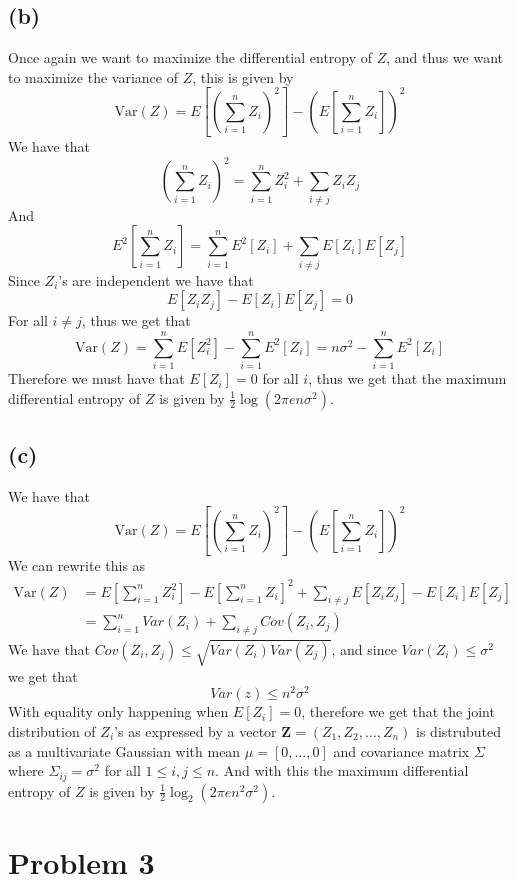 \subsection*{(b)}
Once again we want to maximize the differential entropy of $Z$,
and thus we want to maximize the variance of $Z$, this is given by
$$\text{Var}(Z)=E[(\sum_{i=1}^{n}Z_i)^2]-(E[\sum_{i=1}^{n}Z_i])^2$$
We have that 
$$\left(\sum_{i=1}^{n}Z_i\right)^2=\sum_{i=1}^{n}Z_i^2+\sum_{i\neq j}Z_iZ_j$$
And
$$E^2[\sum_{i=1}^{n}Z_i]=\sum_{i=1}^{n}E^2[Z_i]+\sum_{i\neq j}E[Z_i]E[Z_j]$$
Since $Z_i$'s are independent we have that
$$E[Z_iZ_j]-E[Z_i]E[Z_j]=0$$
For all $i\neq j$, thus we get that
$$\text{Var}(Z)=\sum_{i=1}^{n}E[Z_i^2]-\sum_{i=1}^{n}E^2[Z_i]=n\sigma^2-\sum_{i=1}^{n}E^2[Z_i]$$
Therefore we must have that $E[Z_i]=0$ for all $i$, thus we get that
the maximum differential entropy of $Z$ is given by $\boxed{\frac{1}{2}\log(2\pi e n\sigma^2)}$.
\subsection*{(c)}
We have that 
$$\text{Var}(Z)=E[(\sum_{i=1}^{n}Z_i)^2]-(E[\sum_{i=1}^{n}Z_i])^2$$
We can rewrite this as 
\begin{align*}
    \text{Var}(Z)&=E[\sum_{i=1}^{n}Z_i^2]-E[\sum_{i=1}^{n}Z_i]^2+\sum_{i\neq j}E[Z_iZ_j]-E[Z_i]E[Z_j]\\
    &=\sum_{i=1}^{n}Var(Z_i)+\sum_{i\neq j}Cov(Z_i,Z_j)
\end{align*}
We have that $Cov(Z_i,Z_j)\leq \sqrt{Var(Z_i)Var(Z_j)}$, and since 
$Var(Z_i)\leq \sigma^2$ we get that
$$Var(z)\leq n^2\sigma^2$$
With equality only happening when $E[Z_i]=0$, therefore we get that 
the joint distribution of $Z_i$'s as expressed by a vector  
$\mathbf{Z}=(Z_1,Z_2,\ldots,Z_n)$ is distrubuted as a multivariate Gaussian with mean $\mu=[0,\ldots,0]$ and covariance matrix
$\Sigma$ where $\Sigma_{ij}=\sigma^2$ for all $1\leq i,j\leq n$. And with this the 
maximum differential entropy of $Z$ is given by $\boxed{\frac{1}{2}\log_2(2\pi e n^2\sigma^2)}$.
\section*{Problem 3}
